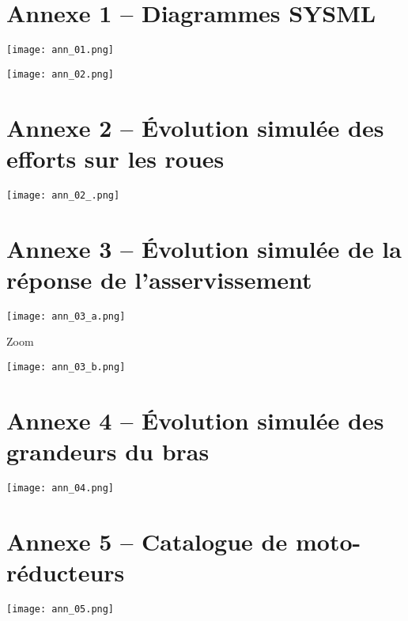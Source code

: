\section*{Annexe 1 -- Diagrammes SYSML}

\begin{center}
\texttt{[image: ann\_01.png]}

\texttt{[image: ann\_02.png]}
\end{center}

\section*{Annexe 2 -- Évolution simulée des efforts sur les roues}

\begin{center}
\texttt{[image: ann\_02\_.png]}
\end{center}


\section*{Annexe 3 -- Évolution simulée de la réponse de l'asservissement}

\begin{center}
\texttt{[image: ann\_03\_a.png]}

\vspace{1cm}

Zoom

\vspace{1cm}

\texttt{[image: ann\_03\_b.png]}
\end{center}


\section*{Annexe 4 -- Évolution simulée des grandeurs du bras}
\begin{center}
\texttt{[image: ann\_04.png]}
\end{center}


\section*{Annexe 5 -- Catalogue de moto-réducteurs}
\begin{center}
\texttt{[image: ann\_05.png]}
\end{center}